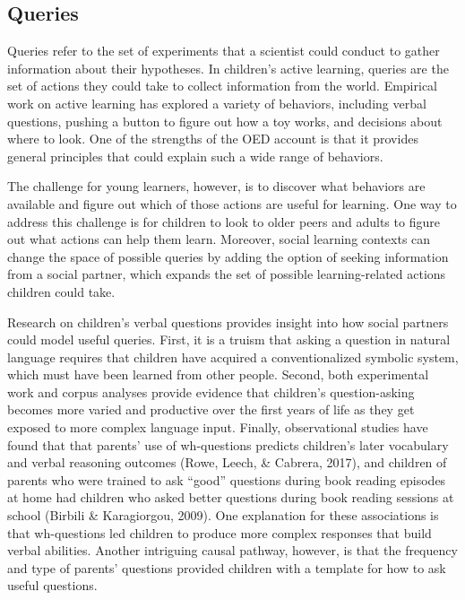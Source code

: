 \documentclass[oneside]{report}
\begin{document}
\subsection{Queries}\label{queries}

Queries refer to the set of experiments that a scientist could conduct
to gather information about their hypotheses. In children's active
learning, queries are the set of actions they could take to collect
information from the world. Empirical work on active learning has
explored a variety of behaviors, including verbal questions, pushing a
button to figure out how a toy works, and decisions about where to look.
One of the strengths of the OED account is that it provides general
principles that could explain such a wide range of behaviors.

The challenge for young learners, however, is to discover what behaviors
are available and figure out which of those actions are useful for
learning. One way to address this challenge is for children to look to
older peers and adults to figure out what actions can help them learn.
Moreover, social learning contexts can change the space of possible
queries by adding the option of seeking information from a social
partner, which expands the set of possible learning-related actions
children could take.

Research on children's verbal questions provides insight into how social
partners could model useful queries. First, it is a truism that asking a
question in natural language requires that children have acquired a
conventionalized symbolic system, which must have been learned from
other people. Second, both experimental work and corpus analyses provide
evidence that children's question-asking becomes more varied and
productive over the first years of life as they get exposed to more
complex language input. Finally, observational studies have found that
that parents' use of wh-questions predicts children's later vocabulary
and verbal reasoning outcomes (Rowe, Leech, \& Cabrera, 2017), and
children of parents who were trained to ask ``good'' questions during
book reading episodes at home had children who asked better questions
during book reading sessions at school (Birbili \& Karagiorgou, 2009).
One explanation for these associations is that wh-questions led children
to produce more complex responses that build verbal abilities. Another
intriguing causal pathway, however, is that the frequency and type of
parents' questions provided children with a template for how to ask
useful questions.
\end{document}
